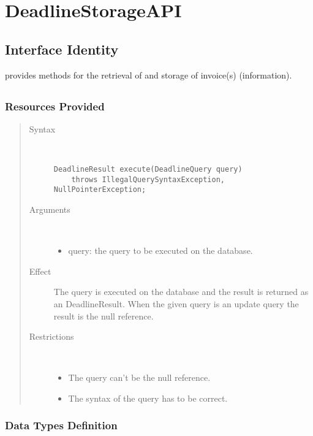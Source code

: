 \section{DeadlineStorageAPI}
\label{api:deadline-storage-api}

\subsection{Interface Identity}

\npar {} provides methods for the retrieval of and
storage of invoice(s) (information).

\subsection{}

\subsubsection{Resources Provided}

\begin{quote}
	\begin{description}
		\item[Syntax] \
		\begin{verbatim}
DeadlineResult execute(DeadlineQuery query)
    throws IllegalQuerySyntaxException, NullPointerException;
		\end{verbatim}
		\item[Arguments] \
		\begin{itemize}
		  \item query: the query to be executed on the database. 
		\end{itemize}
		\item[Effect] The query is executed on the database and the result is returned
		as an DeadlineResult. When the given query is an update query the result is
		the null reference.
		\item[Restrictions] \
		\begin{itemize}
		  \item The query can't be the null reference.
		  \item The syntax of the query has to be correct.
		\end{itemize}
	\end{description} 
\end{quote}

\subsubsection{Data Types Definition}

